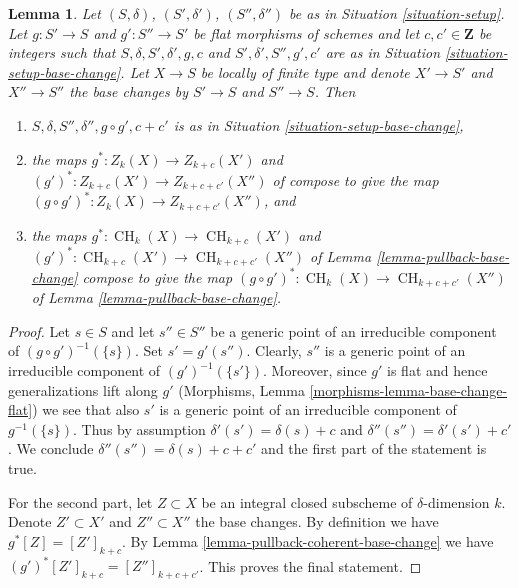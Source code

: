 \documentclass[10pt,a4paper]{amsart}
\theoremstyle{plain}
\newtheorem{lemma}[subsection]{Lemma}
\theoremstyle{definition}
\theoremstyle{remark}
\numberwithin{equation}{subsection}
\def\CH{\mathop{\mathrm{CH}}\nolimits}
\begin{document}
\begin{lemma}
\label{lemma-compose-base-change}
Let $(S, \delta)$, $(S', \delta')$, $(S'', \delta'')$ be as in
Situation \ref{situation-setup}. Let $g : S' \to S$ and $g' : S'' \to S'$
be flat morphisms of schemes and let $c, c' \in \mathbf{Z}$
be integers such that $S, \delta, S', \delta', g, c$ and
$S', \delta', S'', g', c'$ are as in
Situation \ref{situation-setup-base-change}.
Let $X \to S$ be locally of finite type and denote $X' \to S'$
and $X'' \to S''$ the base changes by $S' \to S$ and $S'' \to S$.
Then
\begin{enumerate}
\item $S, \delta, S'', \delta'', g \circ g', c + c'$ is as in
Situation \ref{situation-setup-base-change},
\item the maps $g^* : Z_k(X) \to Z_{k + c}(X')$ and
$(g')^* : Z_{k + c}(X') \to Z_{k + c + c'}(X'')$ of
compose to give the map $(g \circ g')^* : Z_k(X) \to Z_{k + c + c'}(X'')$, and
\item the maps $g^* : \CH_k(X) \to \CH_{k + c}(X')$ and
$(g')^* : \CH_{k + c}(X') \to \CH_{k + c + c'}(X'')$ of
Lemma \ref{lemma-pullback-base-change}
compose to give the map $(g \circ g')^* : \CH_k(X) \to \CH_{k + c + c'}(X'')$
of Lemma \ref{lemma-pullback-base-change}.
\end{enumerate}
\end{lemma}

\begin{proof}
Let $s \in S$ and let $s'' \in S''$ be a generic point of an irreducible
component of $(g \circ g')^{-1}(\{s\})$. Set $s' = g'(s'')$.
Clearly, $s''$ is a generic point of an irreducible component of
$(g')^{-1}(\{s'\})$. Moreover, since $g'$ is flat and hence generalizations
lift along $g'$ (Morphisms, Lemma \ref{morphisms-lemma-base-change-flat})
we see that also $s'$ is a generic point of an irreducible component
of $g^{-1}(\{s\})$. Thus by assumption $\delta'(s') = \delta(s) + c$
and $\delta''(s'') = \delta'(s') + c'$. We conclude
$\delta''(s'') = \delta(s) + c + c'$ and the first part of the
statement is true.

\medskip\noindent
For the second part, let $Z \subset X$ be an integral closed subscheme
of $\delta$-dimension $k$. Denote $Z' \subset X'$ and $Z'' \subset X''$
the base changes. By definition we have $g^*[Z] = [Z']_{k + c}$.
By Lemma \ref{lemma-pullback-coherent-base-change} we have
$(g')^*[Z']_{k + c} = [Z'']_{k + c + c'}$. This proves the final statement.
\end{proof}
\end{document}
